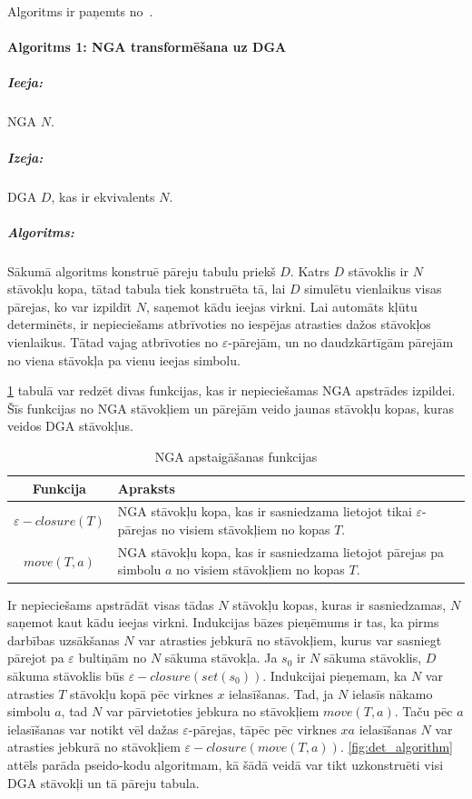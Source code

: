 Algoritms ir paņemts no~\cite{DragonBook}.

\paragraph*{Algoritms 1: NGA transformēšana uz DGA}
\subparagraph{Ieeja:}NGA $N$.
\subparagraph{Izeja:}DGA $D$, kas ir ekvivalents $N$.
\subparagraph{Algoritms:} Sākumā algoritms konstruē pāreju tabulu priekš $D$. Katrs $D$ stāvoklis ir $N$ stāvokļu kopa, tātad tabula tiek konstruēta tā, lai $D$ simulētu vienlaikus visas pārejas, ko var izpildīt $N$, saņemot kādu ieejas virkni. Lai automāts kļūtu determinēts, ir nepieciešams atbrīvoties no iespējas atrasties dažos stāvokļos vienlaikus. Tātad vajag atbrīvoties no $\varepsilon$-pārejām, un no daudzkārtīgām pārejām no viena stāvokļa pa vienu ieejas simbolu.

\ref{fig:NGAoperations} tabulā var redzēt divas funkcijas, kas ir nepieciešamas NGA apstrādes izpildei. Šīs funkcijas no NGA stāvokļiem un pārejām veido jaunas stāvokļu kopas, kuras veidos DGA stāvokļus.

\begin{table}[H]
  \caption{NGA apstaigāšanas funkcijas}
  \centering
  \begin{tabular}{|c|p{350pt}|}
    \hline
    Funkcija & Apraksts \\ \hline
    $\varepsilon-closure (T)$ & 
    NGA stāvokļu kopa, kas ir sasniedzama lietojot tikai $\varepsilon$-pārejas no visiem stāvokļiem no kopas $T$. \\ \hline
    $move (T, a)$ & 
    NGA stāvokļu kopa, kas ir sasniedzama lietojot pārejas pa simbolu $a$ no visiem stāvokļiem no kopas $T$. \\
    \hline
  \end{tabular}
\label{fig:NGAoperations}
\end{table}

Ir nepieciešams apstrādāt visas tādas $N$ stāvokļu kopas, kuras ir sasniedzamas, $N$ saņemot kaut kādu ieejas virkni. Indukcijas bāzes pieņēmums ir tas, ka pirms darbības uzsākšanas $N$ var atrasties jebkurā no stāvokļiem, kurus var sasniegt pārejot pa $\varepsilon$ bultiņām no $N$ sākuma stāvokļa. Ja $s_0$ ir $N$ sākuma stāvoklis, $D$ sākuma stāvoklis būs $\varepsilon-closure (set (s_0))$. Indukcijai pieņemam, ka $N$ var atrasties $T$ stāvokļu kopā pēc virknes $x$ ielasīšanas. Tad, ja $N$ ielasīs nākamo simbolu $a$, tad $N$ var pārvietoties jebkura no stāvokļiem $move (T, a)$. Taču pēc $a$ ielasīšanas var notikt vēl dažas $\varepsilon$-pārejas, tāpēc pēc virknes $xa$ ielasīšanas $N$ var atrasties jebkurā no stāvokļiem $\varepsilon-closure (move (T, a))$. \ref{fig:det_algorithm} attēls parāda pseido-kodu algoritmam, kā šādā veidā var tikt uzkonstruēti visi DGA stāvokļi un tā pāreju tabula.


